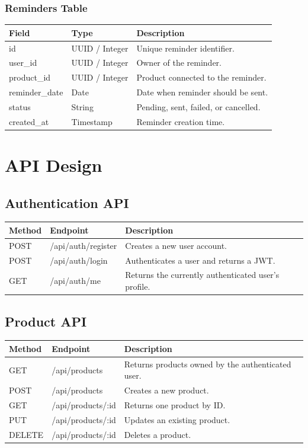 \documentclass[12pt]{article}
\begin{document}
\subsubsection{Reminders Table}
\begin{longtable}{|p{}|p{}|p{}|}
\hline
\textbf{Field} & \textbf{Type} & \textbf{Description} \\
\hline
id & UUID / Integer & Unique reminder identifier. \\
\hline
user\_id & UUID / Integer & Owner of the reminder. \\
\hline
product\_id & UUID / Integer & Product connected to the reminder. \\
\hline
reminder\_date & Date & Date when reminder should be sent. \\
\hline
status & String & Pending, sent, failed, or cancelled. \\
\hline
created\_at & Timestamp & Reminder creation time. \\
\hline
\end{longtable}

\section{API Design}

\subsection{Authentication API}
\begin{longtable}{|p{}|p{}|p{}|}
\hline
\textbf{Method} & \textbf{Endpoint} & \textbf{Description} \\
\hline
POST & /api/auth/register & Creates a new user account. \\
\hline
POST & /api/auth/login & Authenticates a user and returns a JWT. \\
\hline
GET & /api/auth/me & Returns the currently authenticated user's profile. \\
\hline
\end{longtable}

\subsection{Product API}
\begin{longtable}{|p{}|p{}|p{}|}
\hline
\textbf{Method} & \textbf{Endpoint} & \textbf{Description} \\
\hline
GET & /api/products & Returns products owned by the authenticated user. \\
\hline
POST & /api/products & Creates a new product. \\
\hline
GET & /api/products/:id & Returns one product by ID. \\
\hline
PUT & /api/products/:id & Updates an existing product. \\
\hline
DELETE & /api/products/:id & Deletes a product. \\
\hline
\end{longtable}
\end{document}
